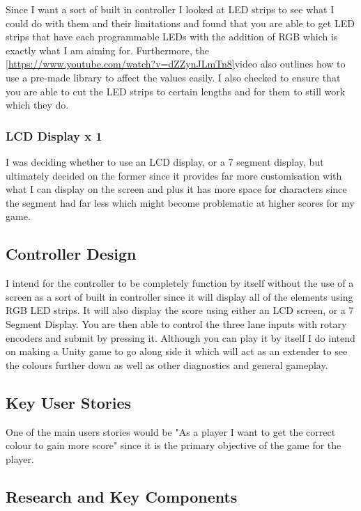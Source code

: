 \documentclass{article}
\begin{document}
Since I want a sort of built in controller I looked at LED strips to see what I could do with them and their limitations and found that you are able to get LED strips that have each programmable LEDs with the addition of RGB which is exactly what I am aiming for. Furthermore, the \ref{https://www.youtube.com/watch?v=dZZynJLmTn8}{video} also outlines how to use a pre-made library to affect the values easily. I also checked to ensure that you are able to cut the LED strips to certain lengths and for them to still work which they do.

\subsubsection{LCD Display x 1}

I was deciding whether to use an LCD display, or a 7 segment display, but ultimately decided on the former since it provides far more customisation with what I can display on the screen and plus it has more space for characters since the segment had far less which might become problematic at higher scores for my game.

\subsection{Controller Design}

I intend for the controller to be completely function by itself without the use of a screen as a sort of built in controller since it will display all of the elements using RGB LED strips. It will also display the score using either an LCD screen, or a 7 Segment Display. You are then able to control the three lane inputs with rotary encoders and submit by pressing it. Although you can play it by itself I do intend on making a Unity game to go along side it which will act as an extender to see the colours further down as well as other diagnostics and general gameplay.

\subsection{Key User Stories}

One of the main users stories would be "As a player I want to get the correct colour to gain more score" since it is the primary objective of the game for the player.

\subsection{Research and Key Components}
\end{document}
